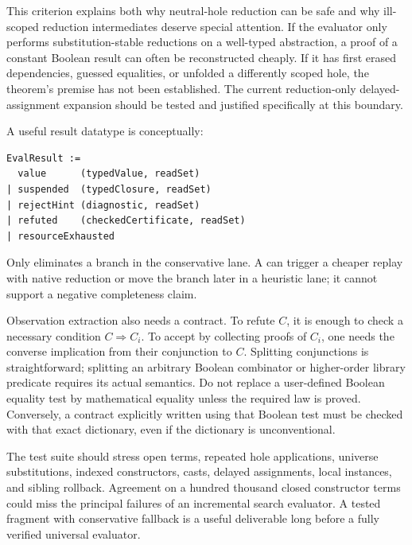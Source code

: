 This criterion explains both why neutral-hole reduction can be safe and why ill-scoped reduction intermediates deserve special attention. If the evaluator only performs substitution-stable reductions on a well-typed abstraction, a proof of a constant Boolean result can often be reconstructed cheaply. If it has first erased dependencies, guessed equalities, or unfolded a differently scoped hole, the theorem's premise has not been established. The current reduction-only delayed-assignment expansion should be tested and justified specifically at this boundary.\cite{implementation}

A useful result datatype is conceptually:
\begin{lstlisting}[caption={Proposed interface, not compiled Lean code.}]
EvalResult :=
  value      (typedValue, readSet)
| suspended  (typedClosure, readSet)
| rejectHint (diagnostic, readSet)
| refuted    (checkedCertificate, readSet)
| resourceExhausted
\end{lstlisting}
Only  eliminates a branch in the conservative lane. A  can trigger a cheaper replay with native reduction or move the branch later in a heuristic lane; it cannot support a negative completeness claim.

Observation extraction also needs a contract. To refute $C$, it is enough to check a necessary condition $C\Rightarrow C_i$. To accept by collecting proofs of $C_i$, one needs the converse implication from their conjunction to $C$. Splitting conjunctions is straightforward; splitting an arbitrary Boolean combinator or higher-order library predicate requires its actual semantics. Do not replace a user-defined Boolean equality test by mathematical equality unless the required law is proved. Conversely, a contract explicitly written using that Boolean test must be checked with that exact dictionary, even if the dictionary is unconventional.

The test suite should stress open terms, repeated hole applications, universe substitutions, indexed constructors, casts, delayed assignments, local instances, and sibling rollback. Agreement on a hundred thousand closed constructor terms could miss the principal failures of an incremental search evaluator. A tested fragment with conservative fallback is a useful deliverable long before a fully verified universal evaluator.


